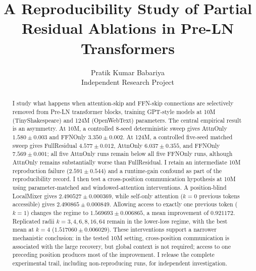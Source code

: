 \documentclass[11pt]{article}
\title{A Reproducibility Study of Partial Residual Ablations in Pre-LN Transformers}
\author{Pratik Kumar Babariya\\Independent Research Project}
\date{}
\begin{document}
\maketitle

\begin{abstract}
I study what happens when attention-skip and FFN-skip connections are selectively removed from Pre-LN transformer blocks, training GPT-style models at 10M (TinyShakespeare) and 124M (OpenWebText) parameters. The central empirical result is an asymmetry. At 10M, a controlled 8-seed deterministic sweep gives AttnOnly $1.580 \pm 0.003$ and FFNOnly $3.350 \pm 0.002$. At 124M, a controlled five-seed matched sweep gives FullResidual $4.577 \pm 0.012$, AttnOnly $6.037 \pm 0.355$, and FFNOnly $7.569 \pm 0.001$; all five AttnOnly runs remain below all five FFNOnly runs, although AttnOnly remains substantially worse than FullResidual. I retain an intermediate 10M reproduction failure ($2.591 \pm 0.544$) and a runtime-gain confound as part of the reproducibility record. I then test a cross-position communication hypothesis at 10M using parameter-matched and windowed-attention interventions. A position-blind LocalMixer gives $2.490527 \pm 0.000369$, while self-only attention ($k=0$ previous tokens accessible) gives $2.490865 \pm 0.000849$. Allowing access to exactly one previous token ($k=1$) changes the regime to $1.569693 \pm 0.006865$, a mean improvement of $0.921172$. Replicated radii $k=3,4,6,8,16,64$ remain in the lower-loss regime, with the best mean at $k=4$ ($1.517060 \pm 0.006029$). These interventions support a narrower mechanistic conclusion: in the tested 10M setting, cross-position communication is associated with the large recovery, but global context is not required; access to one preceding position produces most of the improvement. I release the complete experimental trail, including non-reproducing runs, for independent investigation.
\end{abstract}
\end{document}
